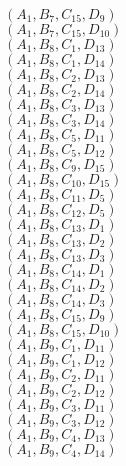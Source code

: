 \documentclass[14pt]{article}
\begin{document}
    $({A}_{1}, {B}_{7}, {C}_{15}, {D}_{9}) $ \\ 
    $({A}_{1}, {B}_{7}, {C}_{15}, {D}_{10}) $ \\ 
    $({A}_{1}, {B}_{8}, {C}_{1}, {D}_{13}) $ \\ 
    $({A}_{1}, {B}_{8}, {C}_{1}, {D}_{14}) $ \\ 
    $({A}_{1}, {B}_{8}, {C}_{2}, {D}_{13}) $ \\ 
    $({A}_{1}, {B}_{8}, {C}_{2}, {D}_{14}) $ \\ 
    $({A}_{1}, {B}_{8}, {C}_{3}, {D}_{13}) $ \\ 
    $({A}_{1}, {B}_{8}, {C}_{3}, {D}_{14}) $ \\ 
    $({A}_{1}, {B}_{8}, {C}_{5}, {D}_{11}) $ \\ 
    $({A}_{1}, {B}_{8}, {C}_{5}, {D}_{12}) $ \\ 
    $({A}_{1}, {B}_{8}, {C}_{9}, {D}_{15}) $ \\ 
    $({A}_{1}, {B}_{8}, {C}_{10}, {D}_{15}) $ \\ 
    $({A}_{1}, {B}_{8}, {C}_{11}, {D}_{5}) $ \\ 
    $({A}_{1}, {B}_{8}, {C}_{12}, {D}_{5}) $ \\ 
    $({A}_{1}, {B}_{8}, {C}_{13}, {D}_{1}) $ \\ 
    $({A}_{1}, {B}_{8}, {C}_{13}, {D}_{2}) $ \\ 
    $({A}_{1}, {B}_{8}, {C}_{13}, {D}_{3}) $ \\ 
    $({A}_{1}, {B}_{8}, {C}_{14}, {D}_{1}) $ \\ 
    $({A}_{1}, {B}_{8}, {C}_{14}, {D}_{2}) $ \\ 
    $({A}_{1}, {B}_{8}, {C}_{14}, {D}_{3}) $ \\ 
    $({A}_{1}, {B}_{8}, {C}_{15}, {D}_{9}) $ \\ 
    $({A}_{1}, {B}_{8}, {C}_{15}, {D}_{10}) $ \\ 
    $({A}_{1}, {B}_{9}, {C}_{1}, {D}_{11}) $ \\ 
    $({A}_{1}, {B}_{9}, {C}_{1}, {D}_{12}) $ \\ 
    $({A}_{1}, {B}_{9}, {C}_{2}, {D}_{11}) $ \\ 
    $({A}_{1}, {B}_{9}, {C}_{2}, {D}_{12}) $ \\ 
    $({A}_{1}, {B}_{9}, {C}_{3}, {D}_{11}) $ \\ 
    $({A}_{1}, {B}_{9}, {C}_{3}, {D}_{12}) $ \\ 
    $({A}_{1}, {B}_{9}, {C}_{4}, {D}_{13}) $ \\ 
    $({A}_{1}, {B}_{9}, {C}_{4}, {D}_{14}) $ \\ 
\end{document}
